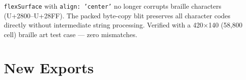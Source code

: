 \texttt{f\allowbreak{}l\allowbreak{}e\allowbreak{}x\allowbreak{}S\allowbreak{}u\allowbreak{}r\allowbreak{}f\allowbreak{}a\allowbreak{}c\allowbreak{}e} with \texttt{a\allowbreak{}l\allowbreak{}i\allowbreak{}g\allowbreak{}n\allowbreak{}:\allowbreak{} \allowbreak{}'\allowbreak{}c\allowbreak{}e\allowbreak{}n\allowbreak{}t\allowbreak{}e\allowbreak{}r\allowbreak{}'} no longer corrupts braille characters (U+2800--U+28FF). The packed byte-copy blit preserves all character codes directly without intermediate string processing. Verified with a 420×140 (58,800 cell) braille art test case --- zero mismatches.

\section{New Exports}\label{record-277-new-exports}

